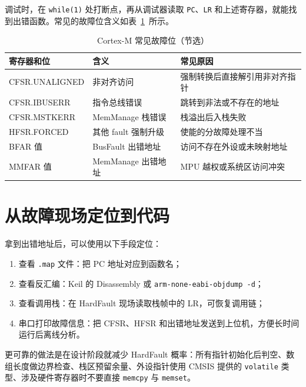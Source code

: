 调试时，在 \texttt{while(1)} 处打断点，再从调试器读取 \texttt{PC}、\texttt{LR} 和上述寄存器，就能找到出错函数。常见的故障位含义如表~\ref{tab:hardfault-bit}~所示。

\begin{table}[htbp]
\centering \caption{Cortex-M 常见故障位（节选）} \label{tab:hardfault-bit}
    \begin{tabular}{lll}
        \toprule
        寄存器和位 & 含义 & 常见原因 \\
        \midrule
        CFSR.UNALIGNED & 非对齐访问 & 强制转换后直接解引用非对齐指针 \\
        CFSR.IBUSERR & 指令总线错误 & 跳转到非法或不存在的地址 \\
        CFSR.MSTKERR & MemManage 栈错误 & 栈溢出后入栈失败 \\
        HFSR.FORCED & 其他 fault 强制升级 & 使能的分故障处理不当 \\
        BFAR 值 & BusFault 出错地址 & 访问不存在外设或未映射地址 \\
        MMFAR 值 & MemManage 出错地址 & MPU 越权或系统区访问冲突 \\
        \bottomrule
    \end{tabular}
\end{table}

\section{从故障现场定位到代码}

拿到出错地址后，可以使用以下手段定位：

\begin{enumerate}
\item 查看 \texttt{.map} 文件：把 PC 地址对应到函数名；
\item 查看反汇编：Keil 的 Disassembly 或 \texttt{arm-none-eabi-objdump -d}；
\item 查看调用栈：在 HardFault 现场读取栈帧中的 LR，可恢复调用链；
\item 串口打印故障信息：把 CFSR、HFSR 和出错地址发送到上位机，方便长时间运行后离线分析。
\end{enumerate}

更可靠的做法是在设计阶段就减少 HardFault 概率：所有指针初始化后判空、数组长度做边界检查、栈区预留余量、外设指针使用 CMSIS 提供的 \texttt{volatile} 类型、涉及硬件寄存器时不要直接 \texttt{memcpy} 与 \texttt{memset}。

